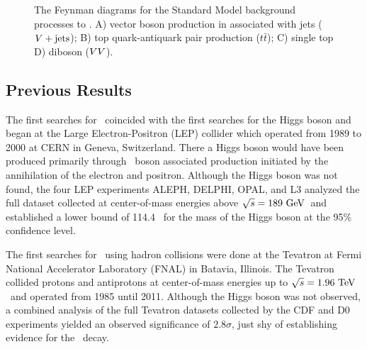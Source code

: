 \begin{figure}[htbp]
{     \qquad
  }
  \caption[\VHbb\ Background Process Diagrams]{The Feynman diagrams for the Standard Model background processes to \VHbb. A) vector boson production in associated with jets ($V+\textrm{jets}$); B) top quark-antiquark pair production ($t\bar{t}$); C) single top  D) diboson ($VV$).}
  \label{fig:VHbkgdiagrams}
\end{figure}

\subsection{Previous Results}

The first searches for \VHbb\ coincided with the first searches for the Higgs boson and began at the Large Electron-Positron (LEP) collider which operated from 1989 to 2000 at CERN in Geneva, Switzerland. There a Higgs boson would have been produced primarily through \bosZ\ boson associated production initiated by the annihilation of the electron and positron. Although the Higgs boson was not found, the four LEP experiments ALEPH, DELPHI, OPAL, and L3 analyzed the full dataset collected at center-of-mass energies above $\sqrt{s} = 189\ \GeV$\ and established a lower bound of 114.4 \GeV\ for the mass of the Higgs boson at the 95\% confidence level.\cite{LEPResult}

The first searches for \VHbb\ using hadron collisions were done at the Tevatron at Fermi National Accelerator Laboratory (FNAL) in Batavia, Illinois. The Tevatron collided protons and antiprotons at center-of-mass energies up to $\sqrt{s} = 1.96\ \mathrm{TeV}$\ and operated from 1985 until 2011. Although the Higgs boson was not observed, a combined analysis of the full Tevatron datasets collected by the CDF and D0 experiments yielded an observed significance of $2.8\sigma$, just shy of establishing evidence for the \VHbb\ decay.\cite{TevatronResult}

